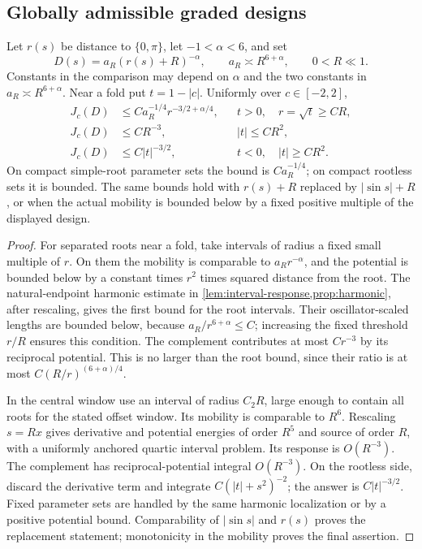 \subsection{Globally admissible graded designs}
\begin{lemma}\label{lem:graded-response}
Let $r(s)$ be distance to $\{0,\pi\}$, let $-1<\alpha<6$, and set
\begin{equation}\label{eq:graded-design}
 D(s)=a_R(r(s)+R)^{-\alpha},\qquad
 a_R\asymp R^{6+\alpha},\qquad 0<R\ll1.
\end{equation}
Constants in the comparison may depend on $\alpha$ and the two
constants in $a_R\asymp R^{6+\alpha}$. Near a fold put $t=1-|c|$.
Uniformly over $c\in[-2,2]$,
\begin{align}
 J_c(D)&\le Ca_R^{-1/4}r^{-3/2+\alpha/4},
       &&t>0,\quad r=\sqrt t\ge CR,\label{eq:graded-root}\\
 J_c(D)&\le CR^{-3},&&|t|\le CR^2,\label{eq:graded-core}\\
 J_c(D)&\le C|t|^{-3/2},&&t<0,\quad |t|\ge CR^2.
                                                   \label{eq:graded-out}
\end{align}
On compact simple-root parameter sets the bound is $Ca_R^{-1/4}$;
on compact rootless sets it is bounded. The same bounds hold with
$r(s)+R$ replaced by $|\sin s|+R$, or when the actual mobility is
bounded below by a fixed positive multiple of the displayed design.
\end{lemma}
\begin{proof}
For separated roots near a fold, take intervals of radius a fixed
small multiple of $r$. On them the mobility is comparable to
$a_Rr^{-\alpha}$, and the potential is bounded below by a constant
times $r^2$ times squared distance from the root. The natural-endpoint
harmonic estimate in \cref{lem:interval-response,prop:harmonic}, after
rescaling, gives the first bound for the root intervals. Their
oscillator-scaled lengths are bounded below, because
$a_R/r^{6+\alpha}\le C$; increasing the fixed threshold $r/R$
ensures this condition. The complement contributes at most $Cr^{-3}$
by its reciprocal potential. This is no larger than the root bound,
since their ratio is at most $C(R/r)^{(6+\alpha)/4}$.

In the central window use an interval of radius $C_2R$, large enough
to contain all roots for the stated offset window. Its mobility is
comparable to $R^6$. Rescaling $s=Rx$ gives derivative and potential
energies of order $R^5$ and source of order $R$, with a uniformly
anchored quartic interval problem. Its response is $O(R^{-3})$.
The complement has reciprocal-potential integral $O(R^{-3})$.
On the rootless side, discard the derivative term and integrate
$C(|t|+s^2)^{-2}$; the answer is $C|t|^{-3/2}$.
Fixed parameter sets are handled by the same harmonic localization
or by a positive potential bound. Comparability of $|\sin s|$ and
$r(s)$ proves the replacement statement; monotonicity in the
mobility proves the final assertion.
\end{proof}

